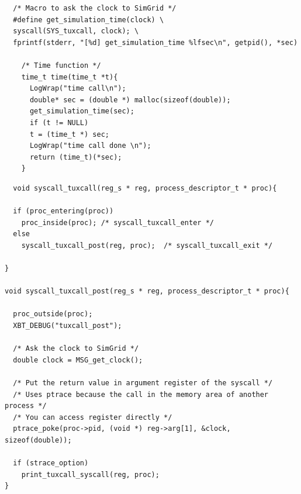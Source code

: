 \vspace{2cm}
\begin{lstlisting}
  /* Macro to ask the clock to SimGrid */
  #define get_simulation_time(clock) \
  syscall(SYS_tuxcall, clock); \
  fprintf(stderr, "[%d] get_simulation_time %lfsec\n", getpid(), *sec)

    /* Time function */
    time_t time(time_t *t){
      LogWrap("time call\n");
      double* sec = (double *) malloc(sizeof(double));
      get_simulation_time(sec);
      if (t != NULL)
      t = (time_t *) sec;
      LogWrap("time call done \n");  
      return (time_t)(*sec);    
    }
\end{lstlisting}

\newpage
{}
\begin{lstlisting}
  void syscall_tuxcall(reg_s * reg, process_descriptor_t * proc){

  if (proc_entering(proc))
    proc_inside(proc); /* syscall_tuxcall_enter */
  else
    syscall_tuxcall_post(reg, proc);  /* syscall_tuxcall_exit */
  
}

void syscall_tuxcall_post(reg_s * reg, process_descriptor_t * proc){

  proc_outside(proc);
  XBT_DEBUG("tuxcall_post");

  /* Ask the clock to SimGrid */
  double clock = MSG_get_clock();
  
  /* Put the return value in argument register of the syscall */
  /* Uses ptrace because the call in the memory area of another process */
  /* You can access register directly */
  ptrace_poke(proc->pid, (void *) reg->arg[1], &clock, sizeof(double)); 

  if (strace_option)
    print_tuxcall_syscall(reg, proc);
}
\end{lstlisting}

